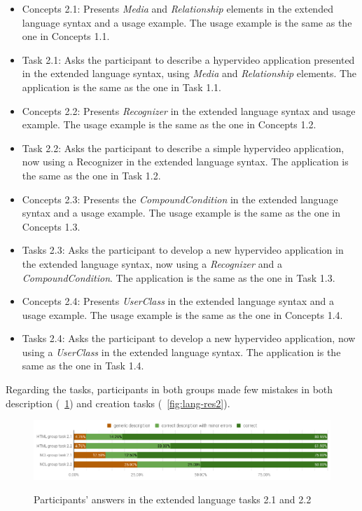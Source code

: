 \documentclass[
  doutorado,
  american
]{ThesisPUC}
\newcommand{\fig}[1]{\figurename~\ref{#1}}
\newcommand{\captionvspace}{\vspace{-1.3em}}
\begin{document}
\begin{itemize}
	\item Concepts 2.1: Presents \textit{Media} and \textit{Relationship} elements
	in the extended language syntax and a usage example. The usage example is the
	same as the one in Concepts 1.1. 
	\item Task 2.1: Asks the participant to describe a hypervideo application
	presented in the extended language syntax, using \textit{Media} and 
	\textit{Relationship} elements. The application is the same as the one in Task
	1.1.
	\item Concepts 2.2: Presents \textit{Recognizer} in the extended language
	syntax and usage example. The usage example is the same as the one in Concepts
	1.2.
	\item Task 2.2: Asks the participant to describe a simple hypervideo
	application, now using a Recognizer in the extended language syntax. The
	application is the same as the one in Task 1.2.
	\item Concepts 2.3: Presents the \textit{CompoundCondition} in the extended
	language syntax and a usage example. The usage example is the same as the one
	in Concepts 1.3.
	\item Tasks 2.3: Asks the participant to develop a new hypervideo application
	in the extended language syntax, now using a \textit{Recognizer} and a 
	\textit{CompoundCondition}. The application is the same as the one in Task
	1.3.
	\item Concepts 2.4: Presents \textit{UserClass} in the extended language
	syntax and a usage example. The usage example is the same as the one in
	Concepts 1.4.
	\item Tasks 2.4: Asks the participant to develop a new hypervideo application,
	now using a \textit{UserClass} in the extended language syntax. The
	application is the same as the one in Task 1.4.
\end{itemize}

Regarding the tasks, participants in both groups made few mistakes in both
description (\fig{fig:lang-res1}) and creation tasks (\fig{fig:lang-res2}).

\begin{figure}[!ht]
\begin{center}
	\includegraphics[width=14cm, keepaspectratio]{img/img23.png}
    \captionvspace
	\caption{Participants’ answers in the extended language tasks 2.1 and 2.2}
    \captionvspace
	\label{fig:lang-res1}
\end{center}
\end{figure}
\end{document}
